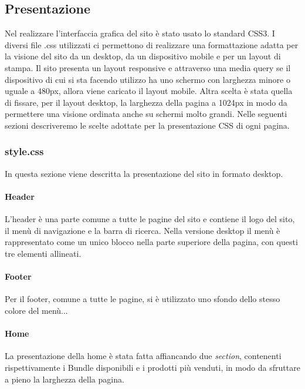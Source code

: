 \subsection{Presentazione}
Nel realizzare l'interfaccia grafica del sito è stato usato lo standard CSS3.\newline
I diversi file .css utilizzati ci permettono di realizzare una formattazione adatta per la visione del sito da un desktop, da un dispositivo mobile e per un layout di stampa. \newline
Il sito presenta un layout responsive e attraverso una media query se il dispositivo di cui si sta facendo utilizzo ha uno schermo con larghezza minore o uguale a 480px, allora viene caricato il layout mobile.\newline
Altra scelta è stata quella di fissare, per il layout desktop, la larghezza della pagina a 1024px in modo da permettere una visione ordinata anche su schermi molto grandi.\newline
Nelle seguenti sezioni descriveremo le scelte adottate per la presentazione CSS di ogni pagina.

\subsubsection{style.css}
In questa sezione viene descritta la presentazione del sito in formato desktop.

\paragraph{Header} \Spazio
L'header è una parte comune a tutte le pagine del sito e contiene il logo del sito, il menù di navigazione e la barra di ricerca.\newline
Nella versione desktop il menù è rappresentato come un unico blocco nella parte superiore della pagina, con questi tre elementi allineati.

\paragraph{Footer} \Spazio
Per il footer, comune a tutte le pagine, si è utilizzato uno sfondo dello stesso colore del menù... 


\paragraph{Home} \Spazio
La presentazione della home è stata fatta affiancando due \emph{section}, contenenti rispettivamente i Bundle disponibili e i prodotti più venduti, in modo da sfruttare a pieno la larghezza della pagina.\newline 


